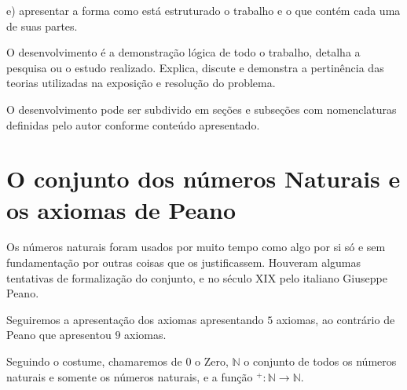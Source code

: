 \documentclass[
	12pt,				%
	oneside,			%
	a4paper,			%
	english,			%
	french,				%
	spanish,			%
	brazil,				%
	]{abntex2}
\newcommand{\N}{\ensuremath {\mathbb{N}} }
\theoremstyle{plain}
\theoremstyle{definition}
\begin{document}
    e) apresentar a forma como está estruturado o trabalho e o que contém cada uma de suas partes.
    
O desenvolvimento é a demonstração lógica de todo o trabalho, detalha a pesquisa ou o estudo realizado. Explica, discute e demonstra a pertinência das teorias utilizadas na exposição e resolução do problema. 

O desenvolvimento pode ser subdivido em seções e subseções com nomenclaturas definidas pelo autor conforme conteúdo apresentado. 

\chapter{O conjunto dos números Naturais e os axiomas de Peano}
Os números naturais foram usados por muito tempo como algo por si só e sem fundamentação por outras coisas que os justificassem.
Houveram algumas tentativas de formalização do conjunto, e no século XIX pelo italiano Giuseppe Peano.

Seguiremos a apresentação dos axiomas apresentando $5$ axiomas, ao contrário de Peano que apresentou $9$ axiomas.

\label{P1}
\label{P2}
\label{P3}
\label{P4}
\label{P5}

Seguindo o costume, chamaremos de $0$ o Zero, \N o conjunto de todos os números naturais e somente os números naturais, e a função $^+: \N \rightarrow \N$.



\end{document}
